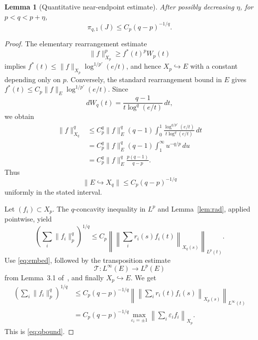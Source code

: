 \documentclass[11pt]{article}
\newtheorem{lemma}{Lemma}
\newcommand{\eps}{\varepsilon}
\begin{document}
\begin{lemma}[Quantitative near-endpoint estimate]\label{lem:q}
After possibly decreasing $\eta$, for $p<q<p+\eta$,
\begin{equation}\label{eq:qbound}
 \pi_{q,1}(J)\le C_p(q-p)^{-1/q}.
\end{equation}
\end{lemma}

\begin{proof}
The elementary rearrangement estimate
\[
 \|f\|_{X_p}^p\ge f^*(t)^pW_p(t)
\]
implies
$f^*(t)\le\|f\|_{X_p}\log^{1/p'}(e/t)$, and hence
$X_p\hookrightarrow E$ with a constant depending only on $p$.
Conversely, the standard rearrangement bound in $E$ gives
$f^*(t)\le C_p\|f\|_E\log^{1/p'}(e/t)$.  Since
\[
 dW_q(t)=\frac{q-1}{t\log^q(e/t)}\,dt,
\]
we obtain
\begin{align*}
 \|f\|_{X_q}^q
 &\le C_p^q\|f\|_E^q(q-1)
   \int_0^1\frac{\log^{q/p'}(e/t)}
                    {t\log^q(e/t)}\,dt\\
 &=C_p^q\|f\|_E^q(q-1)
   \int_1^\infty u^{-q/p}\,du\\
 &=C_p^q\|f\|_E^q\frac{p(q-1)}{q-p}.
\end{align*}
Thus
\begin{equation}\label{eq:embed}
 \|E\hookrightarrow X_q\|
 \le C_p(q-p)^{-1/q}
\end{equation}
uniformly in the stated interval.

Let $(f_i)\subset X_p$.  The $q$-concavity inequality in $L^p$ and
Lemma~\ref{lem:rad}, applied pointwise, yield
\[
 \left(\sum_i\|f_i\|_p^q\right)^{1/q}
 \le C_p\left\|\left\|\sum_i r_i(s)f_i(t)
                  \right\|_{X_q(s)}\right\|_{L^p(t)}.
\]
Use \eqref{eq:embed}, followed by the transposition estimate
\[
 \mathcal T:L^\infty(E)\longrightarrow L^p(E)
\]
from Lemma~3.1 of~\cite{ALW}, and finally $X_p\hookrightarrow E$.  We get
\begin{align*}
 \left(\sum_i\|f_i\|_p^q\right)^{1/q}
 &\le C_p(q-p)^{-1/q}
 \left\|\left\|\sum_i r_i(t)f_i(s)
                  \right\|_{X_p(s)}\right\|_{L^\infty(t)}\\
 &=C_p(q-p)^{-1/q}
 \max_{\eps_i=\pm1}\left\|\sum_i\eps_i f_i\right\|_{X_p}.
\end{align*}
This is \eqref{eq:qbound}.
\end{proof}
\end{document}
